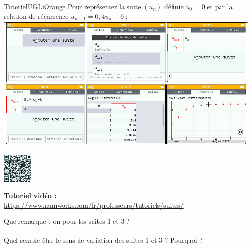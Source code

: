 \documentclass[a4paper,11pt,exos]{nsi} %
\begin{document}
\begin{encadrecolore}{Tutoriel}{UGLiOrange}
	Pour représenter la suite $(u_n)$ définie $u_0=0$ et par la relation de récurrence $u_{n+1}=0,4u_n+6$ :\\
	
	\includegraphics[width=16.5cm]{calculatrice}\\[.5em]
	\begin{minipage}{2cm}
		\includegraphics[width=1.5cm]{qr_code}
	\end{minipage}
	\begin{minipage}{12cm}
		\textbf{Tutoriel vidéo :}\\
		\href{https://www.numworks.com/fr/professeurs/tutoriels/suites/}{https://www.numworks.com/fr/professeurs/tutoriels/suites/}
	\end{minipage}
	
\end{encadrecolore}



Que remarque-t-on pour les suites 1 et 3 ?\\[.5em]
\\

Quel semble être le sens de variation des suites 1 et 3 ? Pourquoi ?\\[.5em]
\end{document}
